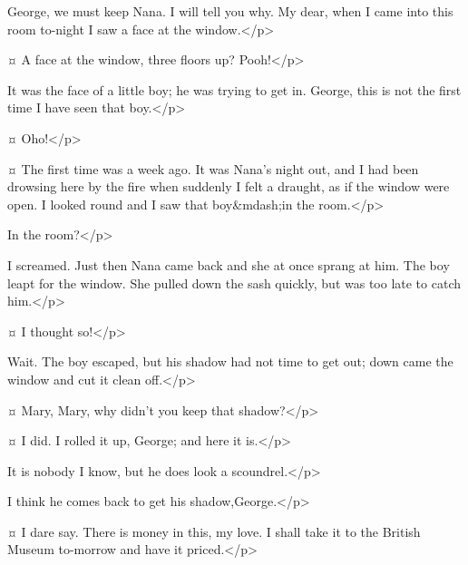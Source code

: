 \mrsdarlingspeaks
George, we must keep Nana.
I will tell you why.
My dear, when I came into this room to-night I saw a face at the window.</p>

\mrdarlingspeaks {}¤
A face at the window, three floors up?
Pooh!</p>

\mrsdarlingspeaks
It was the face of a little boy; he was trying to get in.
George, this is not the first time I have seen that boy.</p>

\mrdarlingspeaks {}¤
Oho!</p>

\mrsdarlingspeaks {}¤
The first time was a week ago.
It was Nana's night out, and I had been drowsing here by the fire when suddenly I felt a draught, as if the window were open.
I looked round and I saw that boy&mdash;in the room.</p>

\mrdarlingspeaks
In the room?</p>

\mrsdarlingspeaks
I screamed.
Just then Nana came back and she at once sprang at him.
The boy leapt for the window.
She pulled down the sash quickly, but was too late to catch him.</p>

\mrdarlingspeaks {}¤
I thought so!</p>

\mrsdarlingspeaks
Wait.
The boy escaped, but his shadow had not time to get out; down came the window and cut it clean off.</p>

\mrdarlingspeaks {}¤
Mary, Mary, why didn't you keep that shadow?</p>

\mrsdarlingspeaks {}¤
I did.
I rolled it up, George; and here it is.</p>


\mrdarlingspeaks
It is nobody I know, but he does look a scoundrel.</p>

\mrsdarlingspeaks
I think he comes back to get his shadow,George.</p>

\mrdarlingspeaks {}¤
I dare say.
There is money in this, my love.
I shall take it to the British Museum to-morrow and have it priced.</p>

